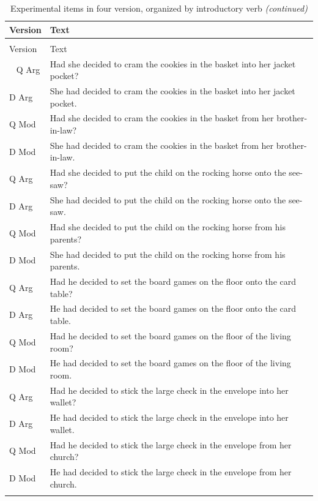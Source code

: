 \documentclass[11pt,oneside]{book}
\begin{document}
\begin{longtable}{ll}
\caption{\label{tab:unnamed-chunk-1}Experimental items in four version, organized by introductory verb}\\
\toprule
Version & Text\\
\midrule
\endfirsthead
\caption[]{\label{tab:unnamed-chunk-1}Experimental items in four version, organized by introductory verb \textit{(continued)}}\\
\toprule
Version & Text\\
\midrule
\endhead
\
\endfoot
\bottomrule
\endlastfoot
Q Arg & Had she decided to cram the cookies in the basket into her jacket pocket?\\
D Arg & She had decided to cram the cookies in the basket into her jacket pocket.\\
Q Mod & Had she decided to cram the cookies in the basket from her brother-in-law?\\
D Mod & She had decided to cram the cookies in the basket from her brother-in-law.\\
\addlinespace
Q Arg & Had she decided to put the child on the rocking horse onto the see-saw?\\
D Arg & She had decided to put the child on the rocking horse onto the see-saw.\\
Q Mod & Had she decided to put the child on the rocking horse from his parents?\\
D Mod & She had decided to put the child on the rocking horse from his parents.\\
\addlinespace
Q Arg & Had he decided to set the board games on the floor onto the card table?\\
D Arg & He had decided to set the board games on the floor onto the card table.\\
Q Mod & Had he decided to set the board games on the floor of the living room?\\
D Mod & He had decided to set the board games on the floor of the living room.\\
\addlinespace
Q Arg & Had he decided to stick the large check in the envelope into her wallet?\\
D Arg & He had decided to stick the large check in the envelope into her wallet.\\
Q Mod & Had he decided to stick the large check in the envelope from her church?\\
D Mod & He had decided to stick the large check in the envelope from her church.\\
\addlinespace

\end{longtable}
\end{document}
